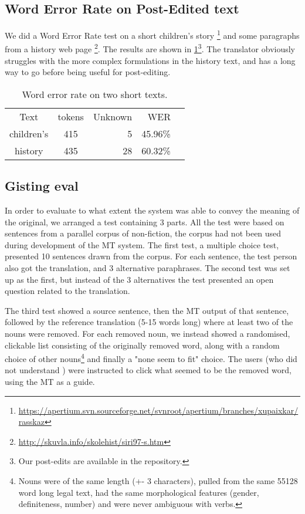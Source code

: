 \subsection{Word Error Rate on Post-Edited text}
\label{sec:WER}
We did a Word Error Rate test on a short children's story
\footnote{\href{https://apertium.svn.sourceforge.net/svnroot/apertium/branches/xupaixkar/rasskaz}{https://apertium.svn.sourceforge.net/svnroot/apertium/branches/xupaixkar/rasskaz}}
and some paragraphs from a history web page
\footnote{\href{http://skuvla.info/skolehist/siri97-s.htm}{http://skuvla.info/skolehist/siri97-s.htm}}.
The results are shown in \ref{table:wer}\footnote{Our post-edits are
  available in the repository.}. The translator obviously struggles
with the more complex formulations in the history text, and has a long
way to go before being useful for post-editing.


\begin{table}
  \begin{center}
  \begin{tabular}{ccrrr}
   Text       & tokens & Unknown & WER  \\
   children's & 415     & 5      & 45.96\% \\
   history    & 435     & 28     & 60.32\%  \\
  \end{tabular}
    \caption{Word error rate on two short texts.}
    \label{table:wer}
  \end{center}
\end{table}


\subsection{Gisting eval}
  
In order to evaluate to what extent the system was able to convey the
meaning of the original, we arranged a test containing 3 parts. All
the test were based on sentences from a parallel corpus of
non-fiction, the corpus had not been used during development of the MT
system. The first test, a multiple choice test, presented 10 sentences
drawn from the corpus. For each sentence, the test person also got the
translation, and 3 alternative paraphrases. The second test was set up
as the first, but instead of the 3 alternatives the test presented an
open question related to the translation.

The third test showed a \sme source sentence, then the MT output of
that sentence, followed by the reference translation (5-15 words long)
where at least two of the nouns were removed. For each removed noun,
we instead showed a randomised, clickable list consisting of the
originally removed word, along with a random choice of other
nouns\footnote{Nouns were of the same length (+- 3 characters), pulled
  from the same 55128 word long legal text, had the same morphological
  features (gender, definiteness, number) and were never ambiguous
  with verbs.} and finally a "none seem to fit" choice. The users (who
did not understand \sme) were instructed to click what seemed to be
the removed word, using the MT as a guide.

